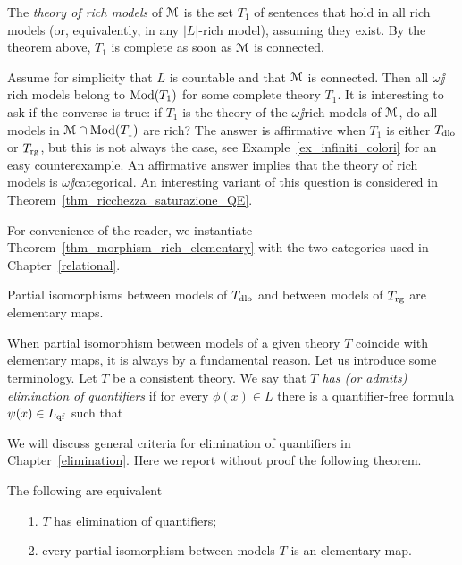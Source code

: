 \documentclass[creche.tex]{subfiles}
\begin{document}
The \emph{theory of rich models\/} of $\EuScript M$ is the set $T_1$ of sentences that hold in all rich models (or, equivalently, in any $|L|$-rich model), assuming they exist.
By the theorem above, $T_1$ is complete as soon as $\EuScript M$ is connected.

Assume for simplicity that $L$ is countable and that $\EuScript M$ is connected.
Then all $\omega\jj$rich models belong to $\mathop{\rm Mod}(T_1)$ for some complete theory $T_1$.
It is interesting to ask if the converse is true: if $T_1$ is the theory of the $\omega\jj$rich models of $\EuScript M$, do all models in $\EuScript M\cap \mathop{\rm Mod}(T_1)$ are rich?  The answer is affirmative when $T_1$ is either $T_{\rm dlo}$ or $T_{\rm rg}$, but this is not always the case, see Example~\ref{ex_infiniti_colori} for an easy counterexample.
An affirmative answer implies that the theory of rich models is $\omega\jj$categorical.
An interesting variant of this question is considered in Theorem~\ref{thm_ricchezza_saturazione_QE}.

For convenience of the reader, we instantiate Theorem~\ref{thm_morphism_rich_elementary} with the two categories used in Chapter~\ref{relational}.

\begin{corollary}\label{coroll_tutteleimmersionisonoelementari_QE}
Partial isomorphisms between models of $T_{\rm dlo}$ and between models of $T_{\rm rg}$ are elementary maps.\QED
\end{corollary}

When partial isomorphism between models of a given theory $T$ coincide with elementary maps, it is always by a fundamental reason.
Let us introduce some terminology.
Let $T$ be a consistent theory.
We say that \emph{$T$ has (or admits) elimination of\/} \emph{quantifiers\/} if for every $\phi(x)\in L$ there is a quantifier-free formula $\psi(x)\in L_{\rm qf}$ such that 


We will discuss general criteria for elimination of quantifiers in Chapter~\ref{elimination}.
Here we report without proof the following theorem.

\begin{theorem}\label{thm_tutteleimmersionisonoelementari_QE}
The following are equivalent
\begin{itemize}
\item[1.] $T$ has elimination of quantifiers;
\item[2.] every partial isomorphism between models $T$ is an elementary map.\QED
\end{itemize}
\end{theorem}
\end{document}
